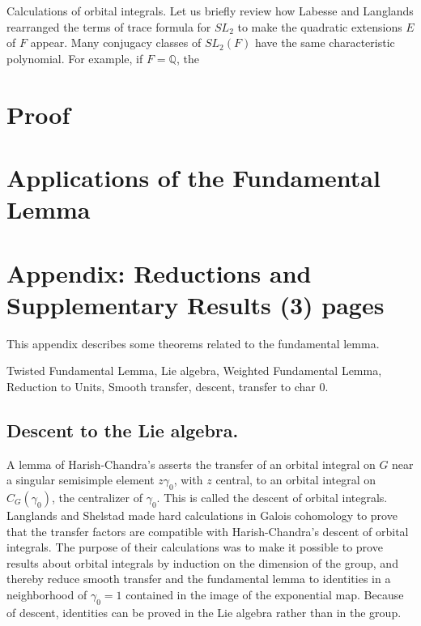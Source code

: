 \documentclass[brochure,english,12pt]{bourbaki}
\newcommand{\ring}[1]{\mathbb{#1}}
\begin{document}
Calculations of orbital integrals.  Let us briefly review how Labesse
and Langlands rearranged the terms of trace formula for $SL_2$ to make
the quadratic extensions $E$ of $F$ appear.  Many conjugacy classes of
$SL_2(F)$ have the same characteristic polynomial.  For example, if
$F=\ring{Q}$, the

\section{Proof} %

\section{Applications of the Fundamental Lemma}  




\section{Appendix: Reductions and Supplementary Results (3) pages}



This appendix describes some theorems related to the fundamental lemma.

Twisted Fundamental Lemma, Lie algebra, Weighted Fundamental Lemma,
Reduction to Units, Smooth transfer, descent, transfer to char 0.

\subsection{Descent to the Lie algebra.}

A lemma of Harish-Chandra's asserts the transfer of an orbital
integral on $G$ near a singular semisimple element $z\gamma_0$, with
$z$ central, to an orbital integral on $C_G(\gamma_0)$, the
centralizer of $\gamma_0$.  This is called the descent of orbital
integrals.  Langlands and Shelstad made hard calculations in
Galois cohomology to prove that the transfer factors are compatible
with Harish-Chandra's descent of orbital integrals.  The purpose of
their calculations was to make it possible to prove results about
orbital integrals by induction on the dimension of the group, and
thereby reduce smooth transfer and the fundamental lemma to identities
in a neighborhood of $\gamma_0=1$ contained in the image of the
exponential map.  Because of descent, identities can be proved in the
Lie algebra rather than in the group.
\end{document}
